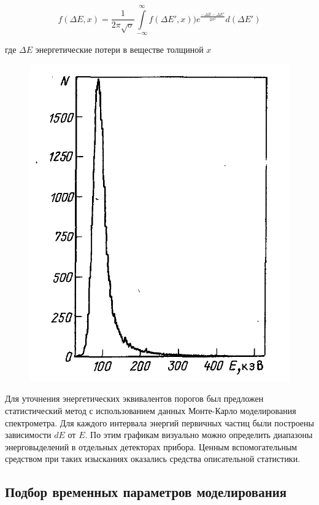 \begin{equation} \label{eq:landau}
f(\Delta E, x) = \frac{1}{2\pi\sqrt{\sigma}} \int\limits_{-\infty}^{\infty}{f(\Delta E', x))e^{\frac{-\Delta E - \Delta E'}{2\sigma^2}}d(\Delta E')}
\end{equation}

где $ \Delta E $ энергетические потери в веществе толщиной $ x $


\begin{figure}
\centering
\includegraphics[width=0.4\linewidth]{images/landau}
\caption{}
\label{fig:landau}
\end{figure}

Для уточнения энергетических эквивалентов порогов был предложен статистический метод с использованием данных Монте-Карло моделирования спектрометра. Для каждого интервала энергий первичных частиц были построены зависимости $ dE $ от $ E $. По этим графикам визуально можно определить диапазоны энерговыделений в отдельных детекторах прибора. Ценным вспомогательным средством при таких изысканиях оказались средства описательной статистики.

\subsection{Подбор временных параметров моделирования}\label{puasson}

